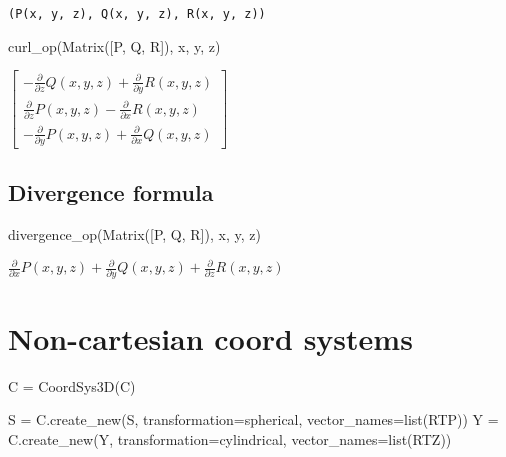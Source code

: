 \documentclass[
  a4paper,
  DIV=11,
  numbers=noendperiod]{scrreprt}
\newenvironment{Shaded}{\begin{snugshade}}{\end{snugshade}}
\newcommand{\BuiltInTok}[1]{\textcolor[rgb]{0.00,0.23,0.31}{#1}}
\newcommand{\NormalTok}[1]{\textcolor[rgb]{0.00,0.23,0.31}{#1}}
\newcommand{\OperatorTok}[1]{\textcolor[rgb]{0.37,0.37,0.37}{#1}}
\newcommand{\StringTok}[1]{\textcolor[rgb]{0.13,0.47,0.30}{#1}}
\begin{document}
\begin{verbatim}
(P(x, y, z), Q(x, y, z), R(x, y, z))
\end{verbatim}

\begin{Shaded}
\begin{Highlighting}[]
\NormalTok{curl\_op(Matrix([P, Q, R]), x, y, z)}
\end{Highlighting}
\end{Shaded}

$\displaystyle \left[\begin{matrix}- \frac{\partial}{\partial z} Q{\left(x,y,z \right)} + \frac{\partial}{\partial y} R{\left(x,y,z \right)}\\\frac{\partial}{\partial z} P{\left(x,y,z \right)} - \frac{\partial}{\partial x} R{\left(x,y,z \right)}\\- \frac{\partial}{\partial y} P{\left(x,y,z \right)} + \frac{\partial}{\partial x} Q{\left(x,y,z \right)}\end{matrix}\right]$

\section{Divergence formula}\label{divergence-formula}

\begin{Shaded}
\begin{Highlighting}[]
\NormalTok{divergence\_op(Matrix([P, Q, R]), x, y, z)}
\end{Highlighting}
\end{Shaded}

$\displaystyle \frac{\partial}{\partial x} P{\left(x,y,z \right)} + \frac{\partial}{\partial y} Q{\left(x,y,z \right)} + \frac{\partial}{\partial z} R{\left(x,y,z \right)}$

\chapter{Non-cartesian coord systems}\label{non-cartesian-coord-systems}

\begin{Shaded}
\begin{Highlighting}[]
\NormalTok{C }\OperatorTok{=}\NormalTok{ CoordSys3D(}\StringTok{\textquotesingle{}C\textquotesingle{}}\NormalTok{)}

\NormalTok{S }\OperatorTok{=}\NormalTok{ C.create\_new(}\StringTok{\textquotesingle{}S\textquotesingle{}}\NormalTok{, transformation}\OperatorTok{=}\StringTok{\textquotesingle{}spherical\textquotesingle{}}\NormalTok{, vector\_names}\OperatorTok{=}\BuiltInTok{list}\NormalTok{(}\StringTok{\textquotesingle{}RTP\textquotesingle{}}\NormalTok{))}
\NormalTok{Y }\OperatorTok{=}\NormalTok{ C.create\_new(}\StringTok{\textquotesingle{}Y\textquotesingle{}}\NormalTok{, transformation}\OperatorTok{=}\StringTok{\textquotesingle{}cylindrical\textquotesingle{}}\NormalTok{, vector\_names}\OperatorTok{=}\BuiltInTok{list}\NormalTok{(}\StringTok{\textquotesingle{}RTZ\textquotesingle{}}\NormalTok{))}
\end{Highlighting}
\end{Shaded}
\end{document}

